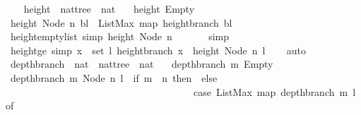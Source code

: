 \begin{isabellebody}
%
\endisadelimproof
\ \ \isanewline
{}\isamarkupfalse%
\ height\ {\isacharcolon}{\isacharcolon}\ {\isachardoublequoteopen}nattree\ {\isasymRightarrow}\ nat{\isachardoublequoteclose}\ \isanewline
\ \ {\isachardoublequoteopen}height\ Empty\ {\isacharequal}\ {}{\isachardoublequoteclose}\isanewline
{\isacharbar}\ {\isachardoublequoteopen}height\ {\isacharparenleft}Node\ n\ bl{\isacharparenright}\ {\isacharequal}\ ListMax\ {\isacharparenleft}map\ height{\isacharunderscore}branch\ bl{\isacharparenright}{\isachardoublequoteclose}\isanewline
\isanewline
{}\isamarkupfalse%
\ height{\isacharunderscore}empty{\isacharunderscore}list\ {\isacharbrackleft}simp{\isacharbrackright}{\isacharcolon}\ {\isachardoublequoteopen}height\ {\isacharparenleft}Node\ n\ {\isacharbrackleft}{\isacharbrackright}{\isacharparenright}\ {\isacharequal}\ {}{\isachardoublequoteclose}\isanewline
%
\isadelimproof
\ \ %
\endisadelimproof
%
\isatagproof
{}\isamarkupfalse%
\ simp%
\endisatagproof
{\isafoldproof}%
%
\isadelimproof
\isanewline
%
\endisadelimproof
\isanewline
{}\isamarkupfalse%
\ height{\isacharunderscore}ge\ {\isacharbrackleft}simp{\isacharbrackright}{\isacharcolon}\ {\isachardoublequoteopen}{\isasymforall}x\ {\isasymin}\ set\ l{\isachardot}\ height{\isacharunderscore}branch\ x\ {\isasymle}\ height\ {\isacharparenleft}Node\ n\ l{\isacharparenright}{\isachardoublequoteclose}\isanewline
%
\isadelimproof
\ \ %
\endisadelimproof
%
\isatagproof
{}\isamarkupfalse%
\ auto%
\endisatagproof
{\isafoldproof}%
%
\isadelimproof
\isanewline
%
\endisadelimproof
\ \isanewline
{}\isamarkupfalse%
\ depth{\isacharunderscore}branch\ {\isacharcolon}{\isacharcolon}\ {\isachardoublequoteopen}nat\ {\isasymRightarrow}\ nattree\ {\isasymRightarrow}\ nat{\isachardoublequoteclose}\ \isanewline
\ \ {\isachardoublequoteopen}depth{\isacharunderscore}branch\ m\ Empty\ {\isacharequal}\ {}{\isachardoublequoteclose}\isanewline
{\isacharbar}\ {\isachardoublequoteopen}depth{\isacharunderscore}branch\ m\ {\isacharparenleft}Node\ n\ l{\isacharparenright}\ {\isacharequal}\ {\isacharparenleft}if\ m\ {\isacharequal}\ n\ then\ {}\ else\ \isanewline
\ \ \ \ \ \ \ \ \ \ \ \ \ \ \ \ \ \ \ \ \ \ \ \ \ \ \ \ \ \ \ \ \ \ \ \ \ \ {\isacharparenleft}case\ ListMax\ {\isacharparenleft}map\ {\isacharparenleft}depth{\isacharunderscore}branch\ m{\isacharparenright}\ l{\isacharparenright}\ of\ \isanewline
\ \ \ \ \ \ \ \ \ \ \ \ \ \ \ \ \ \ \ \ \ \ \ \ \ \ \ \ \ \ \ \ \ \ \ \ \ \ \ \ \ \ \ \ {}\ {\isasymRightarrow}\ {}\ {\isacharbar}\ \isanewline

\end{isabellebody}
